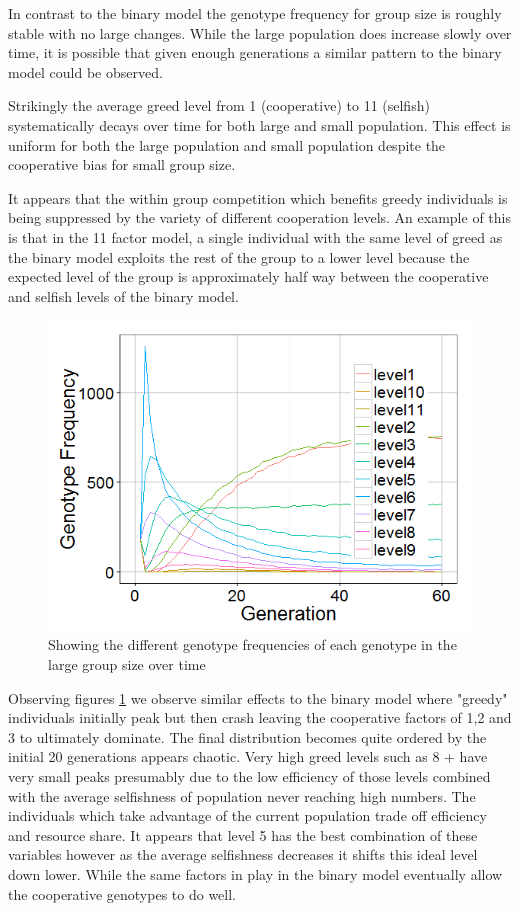 \documentclass[a4paper,10pt, twocolumn]{article}
\begin{document}
In contrast to the binary model the genotype frequency for group size is roughly stable with no large changes. While the large population does increase slowly over time, it is possible that given enough generations a similar pattern to the binary model could be observed. 

Strikingly the average greed level from 1 (cooperative) to 11 (selfish) systematically decays over time for both large and small population. This effect is uniform for both the large population and small population despite the cooperative bias for small group size. 

It appears that the within group competition which benefits greedy individuals is being suppressed by the variety of different cooperation levels. An example of this is that in the 11 factor model, a single individual with the same level of greed as the binary model exploits the rest of the group to a lower level because the expected level of the group is approximately half way between the cooperative and selfish levels of the binary model.  

\begin{figure}[ht]
	\includegraphics[width=0.9\linewidth]{figure5.png}
	\centering
	\caption{Showing the different genotype frequencies of each genotype in the large group size over time}
		\label{fig:figure5}
\end{figure}

Observing figures \ref{fig:figure5} we observe similar effects to the binary model where "greedy" individuals initially peak but then crash leaving the cooperative factors of 1,2 and 3 to ultimately dominate. The final distribution becomes quite ordered by the initial 20 generations appears chaotic. Very high greed levels such as 8 + have very small peaks presumably due to the low efficiency of those levels combined with the average selfishness of population never reaching high numbers. The individuals which take advantage of the current population trade off efficiency and resource share. It appears that level 5 has the best combination of these variables however as the average selfishness decreases it shifts this ideal level down lower. While the same factors in play in the binary model eventually allow the cooperative genotypes to do well. 
\end{document}
